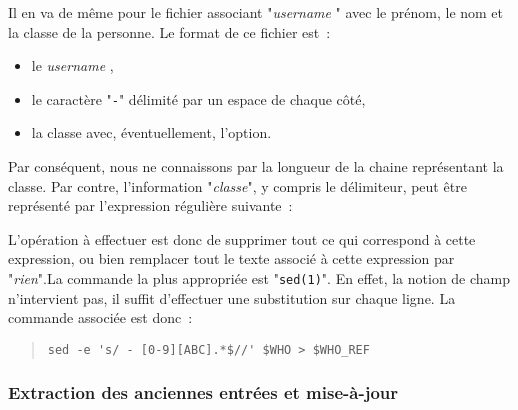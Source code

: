 Il en va de m{\^e}me pour le fichier associant "{\sl username} {\OpenVMS}" avec
le pr{\'e}nom, le nom et la classe de la personne. Le format de ce fichier est~:
\begin{itemize}
	\item	le {\sl username} {\OpenVMS},
	\item	le caract{\`e}re "{\tt -}" d{\'e}limit{\'e} par un espace de chaque c{\^o}t{\'e},
	\item	la classe avec, {\'e}ventuellement, l'option.
\end{itemize}
Par cons{\'e}quent, nous ne connaissons par la longueur de la chaine repr{\'e}sentant
la classe. Par contre, l'information "{\sl classe}", y compris le d{\'e}limiteur,
peut {\^e}tre repr{\'e}sent{\'e} par l'expression r{\'e}guli{\`e}re suivante~:
\begin{center}
\end{center}
L'op{\'e}ration {\`a} effectuer est donc de supprimer tout ce qui correspond {\`a} cette
expression, ou bien remplacer tout le texte associ{\'e} {\`a} cette expression par
"{\sl rien}".La commande la plus appropri{\'e}e est "{\tt sed(1)}". En
effet, la notion de champ n'intervient pas, il suffit d'effectuer
une substitution sur chaque ligne. La commande associ{\'e}e est donc~:
\begin{quote}
\begin{verbatim}
sed -e 's/ - [0-9][ABC].*$//' $WHO > $WHO_REF
\end{verbatim}
\end{quote}

\subsubsection{\label{adv-programming-ex3-devlext}Extraction des anciennes entr{\'e}es
		et mise-{\`a}-jour}

